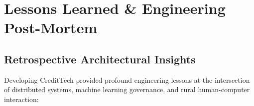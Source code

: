 \chapter{Lessons Learned \& Engineering Post-Mortem}
\label{chap:lessons_learned}

\section{Retrospective Architectural Insights}
Developing CreditTech provided profound engineering lessons at the intersection of distributed systems, machine learning governance, and rural human-computer interaction:

